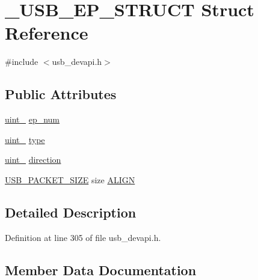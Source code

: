 \hypertarget{struct___u_s_b___e_p___s_t_r_u_c_t}{}\section{\+\_\+\+U\+S\+B\+\_\+\+E\+P\+\_\+\+S\+T\+R\+U\+CT Struct Reference}
\label{struct___u_s_b___e_p___s_t_r_u_c_t}


{\ttfamily \#include $<$usb\+\_\+devapi.\+h$>$}

\subsection*{Public Attributes}
\begin{DoxyCompactItemize}
\item 
\hyperlink{types_8h_ad3209046c23f739a81581c10a4be7d92}{uint\+\_} \hyperlink{struct___u_s_b___e_p___s_t_r_u_c_t_af7b599e1e6dbec304ecb44b715ac9869}{ep\+\_\+num}
\item 
\hyperlink{types_8h_ad3209046c23f739a81581c10a4be7d92}{uint\+\_} \hyperlink{struct___u_s_b___e_p___s_t_r_u_c_t_a65e53e8c8de50af93de7169566dc7259}{type}
\item 
\hyperlink{types_8h_ad3209046c23f739a81581c10a4be7d92}{uint\+\_} \hyperlink{struct___u_s_b___e_p___s_t_r_u_c_t_a11aa613bc89f442c7bc4e94ab124713e}{direction}
\item 
\hyperlink{user__config_8h_a6e29b9c6856f378f54cd7f0a9a7ec910}{U\+S\+B\+\_\+\+P\+A\+C\+K\+E\+T\+\_\+\+S\+I\+ZE} size \hyperlink{struct___u_s_b___e_p___s_t_r_u_c_t_aadedbdb3a944bc55f2fad79e40d68cda}{A\+L\+I\+GN}
\end{DoxyCompactItemize}


\subsection{Detailed Description}


Definition at line 305 of file usb\+\_\+devapi.\+h.



\subsection{Member Data Documentation}
